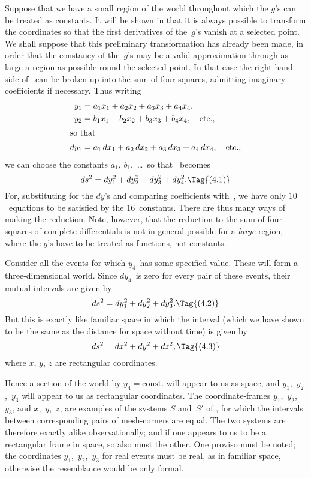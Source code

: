 \documentclass[12pt]{book}
\begin{document}
%
%

Suppose that we have a small region of the world throughout which the
$g$'s can be treated as constants\footnotemark.\footnotetext
  {It will be shown in  that it is always possible to transform the coordinates so that the
  first derivatives of the~$g$'s vanish at a selected point. We shall suppose that this preliminary
  transformation has already been made, in order that the constancy of the~$g$'s may be a valid
  approximation through as large a region as possible round the selected point.}
In that case the right\hyp{}hand side of~ can
be broken up into the sum of four squares, admitting imaginary coefficients
if necessary. Thus writing
\begin{align*}
  y_1 &= a_1 x_1 + a_2 x_2 + a_3 x_3 + a_4 x_4, \\
  y_2 &= b_1 x_1 + b_2 x_2 + b_3 x_3 + b_4 x_4,\quad\text{etc.,} \\
\intertext{so that}
  dy_1 &= a_1\, dx_1 + a_2\, dx_2 + a_3\, dx_3 + a_4\, dx_4,\quad\text{etc.,}
\end{align*}
we can choose the constants $a_1$, $b_1$,~\dots\ so that ~becomes
\[
ds^2 = dy_1^2 + dy_2^2 + dy_3^2 + dy_4^2.
\Tag{(4.1)}
\]
For, substituting for the $dy$'s and comparing coefficients with~, we have
only $10$~equations to be satisfied by the $16$~constants. There are thus many
ways of making the reduction. Note, however, that the reduction to the sum
of four squares of complete differentials is not in general possible for a \emph{large}
region, where the $g$'s have to be treated as functions, not constants.

Consider all the events for which $y_4$~has some specified value. These will
form a three\hyp{}dimensional world. Since $dy_4$~is zero for every pair of these
events, their mutual intervals are given by
\[
ds^2 = dy_1^2 + dy_2^2 + dy_3^2.
\Tag{(4.2)}
\]
But this is exactly like familiar space in which the interval (which we have
shown to be the same as the distance for space without time) is given by
\[
ds^2 = dx^2 + dy^2 + dz^2,
\Tag{(4.3)}
\]
where $x$, $y$, $z$ are rectangular coordinates.

Hence a section of the world by $y_4 = \text{const.}$ will appear to us as space, and
$y_1$,~$y_2$,~$y_3$ will appear to us as rectangular coordinates. The coordinate\hyp{}frames
$y_1$,~$y_2$,~$y_3$, and $x$,~$y$,~$z$, are examples of the systems $S$ and~$S'$ of , for which
the intervals between corresponding pairs of mesh\hyp{}corners are equal. The
two systems are therefore exactly alike observationally; and if one appears
to us to be a rectangular frame in space, so also must the other. One proviso
must be noted; the coordinates $y_1$,~$y_2$,~$y_3$ for real events must be real, as in
familiar space, otherwise the resemblance would be only formal.
\end{document}
